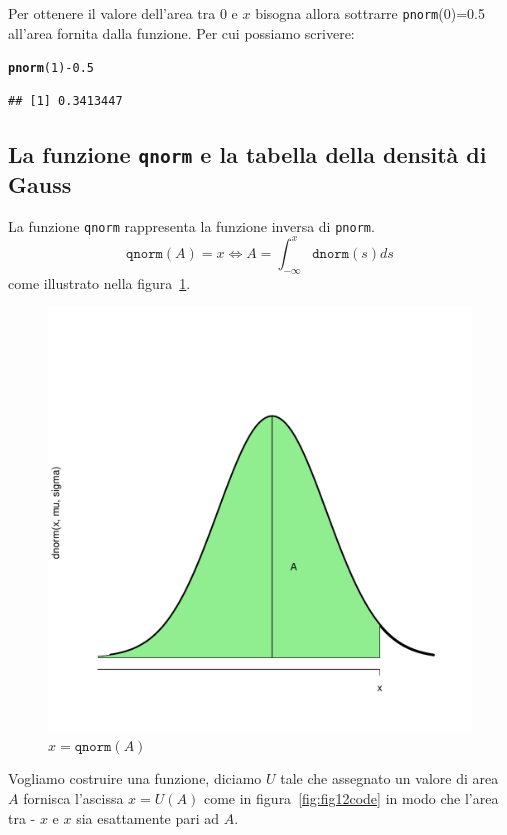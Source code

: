\documentclass[onecolumn,12pt]{book}\usepackage[]{graphicx}\usepackage[]{color}
\makeatletter
\def\maxwidth{ %
  \ifdim\Gin@nat@width>\linewidth
    \linewidth
  \else
    \Gin@nat@width
  \fi
}
\newcommand{\hlnum}[1]{\textcolor[rgb]{0.686,0.059,0.569}{#1}}%
\newcommand{\hlopt}[1]{\textcolor[rgb]{0,0,0}{#1}}%
\newcommand{\hlstd}[1]{\textcolor[rgb]{0.345,0.345,0.345}{#1}}%
\newcommand{\hlkwd}[1]{\textcolor[rgb]{0.737,0.353,0.396}{\textbf{#1}}}%
\newenvironment{kframe}{%
 \def\at@end@of@kframe{}%
 \ifinner\ifhmode%
  \def\at@end@of@kframe{\end{minipage}}%
  \begin{minipage}{\columnwidth}%
 \fi\fi%
 \def\FrameCommand##1{\hskip\@totalleftmargin \hskip-\fboxsep
 \colorbox{shadecolor}{##1}\hskip-\fboxsep
     \hskip-\linewidth \hskip-\@totalleftmargin \hskip\columnwidth}%
 \MakeFramed {\advance\hsize-\width
   \@totalleftmargin\z@ \linewidth\hsize
   \@setminipage}}%
 {\par\unskip\endMakeFramed%
 \at@end@of@kframe}
\newenvironment{knitrout}{}{} %
\makeatother
\begin{document}
Per ottenere il valore dell'area tra 0 e $x$ bisogna allora sottrarre \texttt{pnorm}(0)=0.5 all'area fornita dalla funzione.
Per cui possiamo scrivere:
\begin{knitrout}
\color{fgcolor}\begin{kframe}
\begin{alltt}
\hlkwd{pnorm}\hlstd{(}\hlnum{1}\hlstd{)}\hlopt{-}\hlnum{0.5}
\end{alltt}
\begin{verbatim}
## [1] 0.3413447
\end{verbatim}
\end{kframe}
\end{knitrout}


\subsection{La funzione \texttt{qnorm} e la tabella della densit\`a di Gauss}


La funzione \texttt{qnorm} rappresenta la funzione inversa di \texttt{pnorm}.
\[\texttt{qnorm}(A)=x\Leftrightarrow A=\int_{-\infty}^x \texttt{dnorm}(s)ds\] 
come illustrato nella figura~\ref{fig:fig2code}.
\begin{center}
\begin{figure}[H]
\begin{knitrout}
\color{fgcolor}
\includegraphics[width=\maxwidth]{figure/unnamed-chunk-144-1} 

\end{knitrout}
\caption{$x=\texttt{qnorm}(A)$}
\label{fig:fig2code}
\end{figure}
\end{center}
Vogliamo costruire una funzione, diciamo $U$ tale che assegnato un valore di area $A$   fornisca l'ascissa $x=U(A)$ come in figura~\ref{fig:fig12code} in modo che l'area tra - $x$ e $x$ sia esattamente pari ad $A$.  
\end{document}
